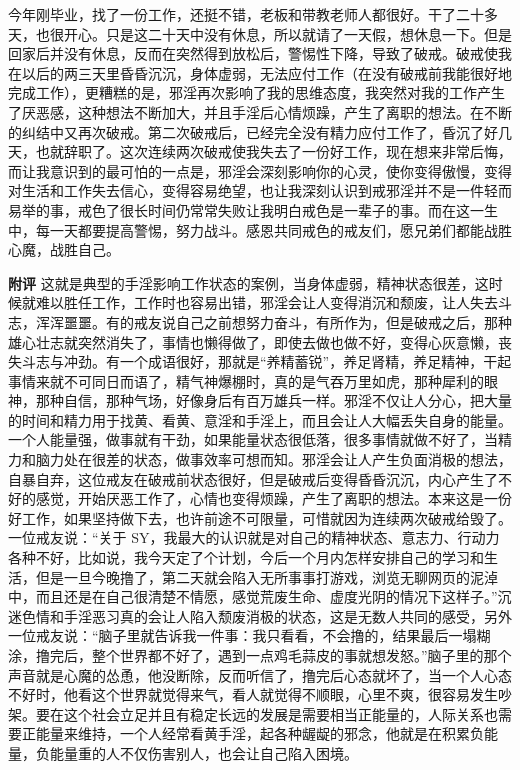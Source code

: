 \begin{case}
    今年刚毕业，找了一份工作，还挺不错，老板和带教老师人都很好。干了二十多天，也很开心。只是这二十天中没有休息，所以就请了一天假，想休息一下。但是回家后并没有休息，反而在突然得到放松后，警惕性下降，导致了破戒。破戒使我在以后的两三天里昏昏沉沉，身体虚弱，无法应付工作（在没有破戒前我能很好地完成工作），更糟糕的是，邪淫再次影响了我的思维态度，我突然对我的工作产生了厌恶感，这种想法不断加大，并且手淫后心情烦躁，产生了离职的想法。在不断的纠结中又再次破戒。第二次破戒后，已经完全没有精力应付工作了，昏沉了好几天，也就辞职了。这次连续两次破戒使我失去了一份好工作，现在想来非常后悔，而让我意识到的最可怕的一点是，邪淫会深刻影响你的心灵，使你变得傲慢，变得对生活和工作失去信心，变得容易绝望，也让我深刻认识到戒邪淫并不是一件轻而易举的事，戒色了很长时间仍常常失败让我明白戒色是一辈子的事。而在这一生中，每一天都要提高警惕，努力战斗。感恩共同戒色的戒友们，愿兄弟们都能战胜心魔，战胜自己。

    \textbf{附评} 这就是典型的手淫影响工作状态的案例，当身体虚弱，精神状态很差，这时候就难以胜任工作，工作时也容易出错，邪淫会让人变得消沉和颓废，让人失去斗志，浑浑噩噩。有的戒友说自己之前想努力奋斗，有所作为，但是破戒之后，那种雄心壮志就突然消失了，事情也懒得做了，即使去做也做不好，变得心灰意懒，丧失斗志与冲劲。有一个成语很好，那就是“养精蓄锐”，养足肾精，养足精神，干起事情来就不可同日而语了，精气神爆棚时，真的是气吞万里如虎，那种犀利的眼神，那种自信，那种气场，好像身后有百万雄兵一样。邪淫不仅让人分心，把大量的时间和精力用于找黄、看黄、意淫和手淫上，而且会让人大幅丢失自身的能量。一个人能量强，做事就有干劲，如果能量状态很低落，很多事情就做不好了，当精力和脑力处在很差的状态，做事效率可想而知。邪淫会让人产生负面消极的想法，自暴自弃，这位戒友在破戒前状态很好，但是破戒后变得昏昏沉沉，内心产生了不好的感觉，开始厌恶工作了，心情也变得烦躁，产生了离职的想法。本来这是一份好工作，如果坚持做下去，也许前途不可限量，可惜就因为连续两次破戒给毁了。一位戒友说：“关于 SY，我最大的认识就是对自己的精神状态、意志力、行动力各种不好，比如说，我今天定了个计划，今后一个月内怎样安排自己的学习和生活，但是一旦今晚撸了，第二天就会陷入无所事事打游戏，浏览无聊网页的泥淖中，而且还是在自己很清楚不情愿，感觉荒废生命、虚度光阴的情况下这样子。”沉迷色情和手淫恶习真的会让人陷入颓废消极的状态，这是无数人共同的感受，另外一位戒友说：“脑子里就告诉我一件事：我只看看，不会撸的，结果最后一塌糊涂，撸完后，整个世界都不好了，遇到一点鸡毛蒜皮的事就想发怒。”脑子里的那个声音就是心魔的怂恿，他没断除，反而听信了，撸完后心态就坏了，当一个人心态不好时，他看这个世界就觉得来气，看人就觉得不顺眼，心里不爽，很容易发生吵架。要在这个社会立足并且有稳定长远的发展是需要相当正能量的，人际关系也需要正能量来维持，一个人经常看黄手淫，起各种龌龊的邪念，他就是在积累负能量，负能量重的人不仅伤害别人，也会让自己陷入困境。
\end{case}

